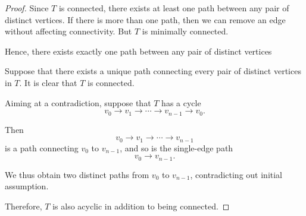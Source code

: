 \begin{proof}
  Since \( T \) is connected, there exists at least one path between any pair of distinct vertices. If there is more than one path, then we can remove an edge without affecting connectivity. But \( T \) is minimally connected.

  Hence, there exists exactly one path between any pair of distinct vertices

   Suppose that there exists a unique path connecting every pair of distinct vertices in \( T \). It is clear that \( T \) is connected.

  Aiming at a contradiction, suppose that \( T \) has a cycle
  \begin{equation*}
    v_0 \to v_1 \to \cdots \to v_{n-1} \to v_0.
  \end{equation*}

  Then
  \begin{equation*}
    v_0 \to v_1 \to \cdots \to v_{n-1}
  \end{equation*}
  is a path connecting \( v_0 \) to \( v_{n-1} \), and so is the single-edge path
  \begin{equation*}
    v_0 \to v_{n-1}.
  \end{equation*}

  We thus obtain two distinct paths from \( v_0 \) to \( v_{n-1} \), contradicting out initial assumption.

  Therefore, \( T \) is also acyclic in addition to being connected.
\end{proof}

